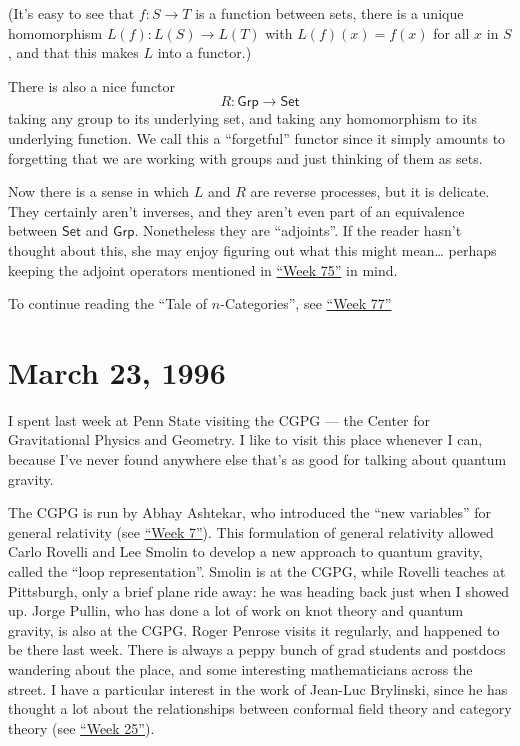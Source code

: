 \documentclass{article}
\begin{document}
(It's easy to see that \(f\colon S\to T\) is a function between sets,
there is a unique homomorphism \(L(f)\colon L(S)\to L(T)\) with
\(L(f)(x) = f(x)\) for all \(x\) in \(S\), and that this makes \(L\)
into a functor.)

There is also a nice functor \[R\colon\mathsf{Grp}\to\mathsf{Set}\]
taking any group to its underlying set, and taking any homomorphism to
its underlying function. We call this a ``forgetful'' functor since it
simply amounts to forgetting that we are working with groups and just
thinking of them as sets.

Now there is a sense in which \(L\) and \(R\) are reverse processes, but
it is delicate. They certainly aren't inverses, and they aren't even
part of an equivalence between \(\mathsf{Set}\) and \(\mathsf{Grp}\).
Nonetheless they are ``adjoints''. If the reader hasn't thought about
this, she may enjoy figuring out what this might mean\ldots{} perhaps
keeping the adjoint operators mentioned in
\protect\hyperlink{week75}{``Week 75''} in mind.

To continue reading the ``Tale of \(n\)-Categories'', see
\protect\hyperlink{week77}{``Week 77''}



\hypertarget{week77}{%
\section{March 23, 1996}\label{week77}}

I spent last week at Penn State visiting the CGPG --- the Center for
Gravitational Physics and Geometry. I like to visit this place whenever
I can, because I've never found anywhere else that's as good for talking
about quantum gravity.

The CGPG is run by Abhay Ashtekar, who introduced the ``new variables''
for general relativity (see \protect\hyperlink{week7}{``Week 7''}). This
formulation of general relativity allowed Carlo Rovelli and Lee Smolin
to develop a new approach to quantum gravity, called the ``loop
representation''. Smolin is at the CGPG, while Rovelli teaches at
Pittsburgh, only a brief plane ride away: he was heading back just when
I showed up. Jorge Pullin, who has done a lot of work on knot theory and
quantum gravity, is also at the CGPG. Roger Penrose visits it regularly,
and happened to be there last week. There is always a peppy bunch of
grad students and postdocs wandering about the place, and some
interesting mathematicians across the street. I have a particular
interest in the work of Jean-Luc Brylinski, since he has thought a lot
about the relationships between conformal field theory and category
theory (see \protect\hyperlink{week25}{``Week 25''}).
\end{document}
